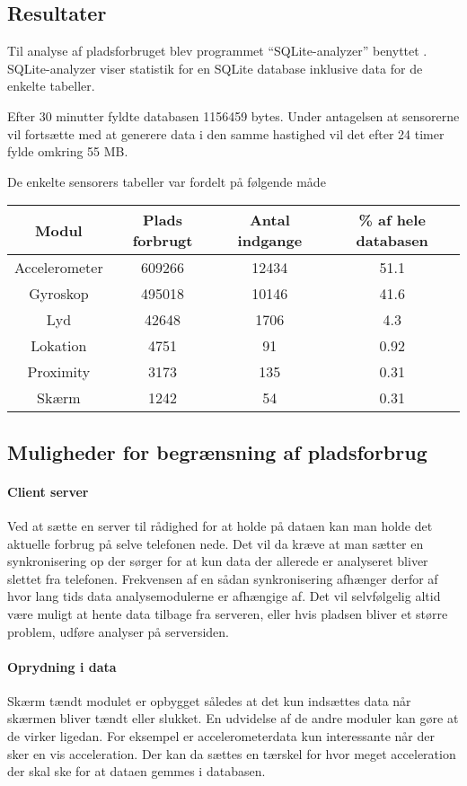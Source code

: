 \subsection{Resultater}
Til analyse af pladsforbruget blev programmet ``SQLite-analyzer'' benyttet \cite{sqliteanalyzer}.
SQLite-analyzer viser statistik for en SQLite database inklusive data for de enkelte tabeller.

Efter 30 minutter fyldte databasen 1156459 bytes.
Under antagelsen at sensorerne vil fortsætte med at generere data i den samme hastighed vil det efter 24 timer fylde omkring 55 MB. 

De enkelte sensorers tabeller var fordelt på følgende måde

\begin{tabular}{|c|c|c|c|}
	\hline Modul & Plads forbrugt & Antal indgange & \% af hele databasen \\
	\hline Accelerometer & 609266 & 12434 & 51.1 \\ 
	\hline Gyroskop & 495018 & 10146 & 41.6\\ 
	\hline Lyd & 42648 & 1706 & 4.3 \\ 
	\hline Lokation & 4751 & 91 & 0.92 \\ 
	\hline Proximity & 3173 & 135 & 0.31 \\ 
	\hline Skærm & 1242 & 54 & 0.31 \\ 
	\hline 
\end{tabular} 

\subsection{Muligheder for begrænsning af pladsforbrug}

\paragraph{Client server}
Ved at sætte en server til rådighed for at holde på dataen kan man holde det aktuelle forbrug på selve telefonen nede.
Det vil da kræve at man sætter en synkronisering op der sørger for at kun data der allerede er analyseret bliver slettet fra telefonen. 
Frekvensen af en sådan synkronisering afhænger derfor af hvor lang tids data analysemodulerne er afhængige af.
Det vil selvfølgelig altid være muligt at hente data tilbage fra serveren, eller hvis pladsen bliver et større problem, udføre analyser på serversiden.

\paragraph{Oprydning i data}
Skærm tændt modulet er opbygget således at det kun indsættes data når skærmen bliver tændt eller slukket.
En udvidelse af de andre moduler kan gøre at de virker ligedan. 
For eksempel er accelerometerdata kun interessante når der sker en vis acceleration.
Der kan da sættes en tærskel for hvor meget acceleration der skal ske for at dataen gemmes i databasen.

